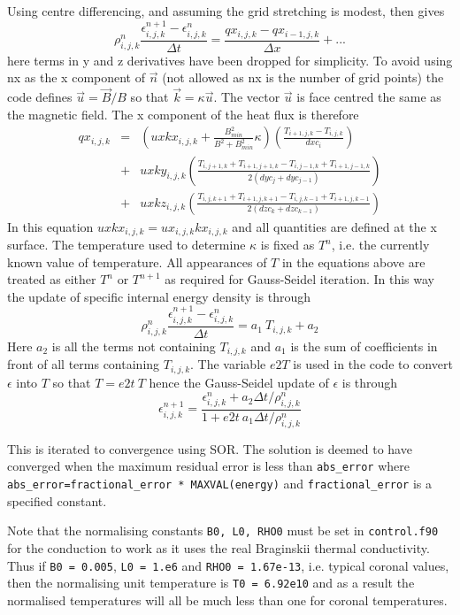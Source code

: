 \documentclass[11pt]{article}
\begin{document}
Using centre differencing, and assuming the grid stretching is modest,  then gives
\[
\rho_{i,j,k}^n \frac{\epsilon_{i,j,k}^{n+1}- \epsilon_{i,j,k}^{n}}{\Delta t}  =  
\frac{qx_{i,j,k}- qx_{i-1,j,k}}{\Delta x} + ...
\]      
here terms in y and z derivatives have been dropped for simplicity. To avoid using nx as the x component of $\vec{n}$ (not allowed as nx is the number of grid points) the code defines $\vec{u}=\vec{B}/B$ so that $\vec{k} = \kappa \vec{u}$. The vector $\vec{u}$ is face centred the same as the magnetic field. The x component of the heat flux is therefore
\begin{eqnarray*}
qx_{i,j,k}&=&\left(uxkx_{i,j,k} + \frac{B_{min}^2}{B^2+B_{min}^2}\kappa \right)\left(\frac{T_{i+1,j,k}-T_{i,j,k}}{dxc_i} 
    \right) \\
    &+& uxky_{i,j,k}\left(\frac{T_{i,j+1,k}+T_{i+1,j+1,k}-T_{i,j-1,k}+T_{i+1,j-1,k}}{2(dyc_j+dyc_{j-1})} \right) \\
    &+& uxkz_{i,j,k}\left(\frac{T_{i,j,k+1}+T_{i+1,j,k+1}-T_{i,j,k-1}+T_{i+1,j,k-1}}{2(dzc_k+dzc_{k-1})} \right)
\end{eqnarray*}
In this equation $uxkx_{i,j,k}=ux_{i,j,k}kx_{i,j,k}$ and all quantities are defined at the x surface. The temperature used to determine $\kappa$ is fixed as $T^n$, i.e. the currently known value of temperature. All appearances of $T$ in the equations above are treated as either $T^n$ or $T^{n+1}$ as required for Gauss-Seidel iteration. In this way the update of specific internal energy density is through
\[
\rho_{i,j,k}^n \frac{\epsilon_{i,j,k}^{n+1}- \epsilon_{i,j,k}^{n}}{\Delta t}  =  a_1\ T_{i,j,k} + a_2
\]
Here $a_2$ is all the terms not containing $T_{i,j,k}$ and $a_1$ is the sum of coefficients in front of all terms containing 
$T_{i,j,k}$.
The variable $e2T$ is used in the code to convert $\epsilon$ into $T$ so that $T=e2t \ T$ hence the Gauss-Seidel update of $\epsilon$ is through
\[
\epsilon_{i,j,k}^{n+1}=\frac{\epsilon_{i,j,k}^{n} + a_2 \Delta t /\rho_{i,j,k}^n}{1+e2t\ a_1 \Delta t /\rho_{i,j,k}^n}
\]

This is iterated to convergence using SOR. The solution is deemed to have converged when the maximum residual error is less than \texttt{abs\_error} where \texttt{abs\_error=fractional\_error * MAXVAL(energy)} and \texttt{fractional\_error} is a specified constant. 

Note that the normalising constants \texttt{B0, L0, RHO0} must be set in \texttt{control.f90} for the conduction to work as it uses the real Braginskii thermal conductivity. Thus if \texttt{B0 = 0.005}, \texttt{L0 = 1.e6} and \texttt{RHO0 = 1.67e-13}, i.e. typical coronal values, then the normalising unit temperature is \texttt{T0 = 6.92e10} and as a result the normalised temperatures will all be much less than one for coronal temperatures.  
\end{document}
